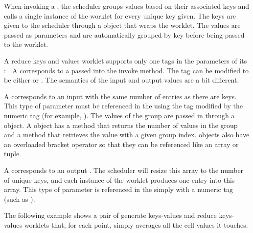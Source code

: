 When invoking a , the scheduler groups
values based on their associated keys and calls a single instance of the
worklet for every unique key given. The keys are given to the scheduler
through a  object that wraps the
worklet.  The values are passed as parameters
and are automatically grouped by key before being passed to the worklet.

A reduce keys and values worklet supports only one tags in the parameters
of its \controlsignature: . A  corresponds to a
 passed into the invoke method. The  tag
can be modified to be either  or . The semantics of
the input and output values are a bit different.

A  corresponds to an input  with
the same number of entries as there are keys. This type of parameter must
be referenced in the \executionsignature using the  tag
modified by the numeric tag (for example, ). The
values of the group are passed in through a  object. A
 object has a  method
that returns the number of values in the group and a  method
that retrieves the value with a given group
index.  objects also have an overloaded bracket
operator so that they can be referenced like an array or tuple.

A  corresponds to an output
. The scheduler will resize this array to the number
of unique keys, and each instance of the worklet produces one entry into
this array. This type of parameter is referenced in the \executionsignature
simply with a numeric tag (such as ).

The following example shows a pair of generate keys-values and reduce
keys-values worklets that, for each point, simply averages all the cell
values it touches.

